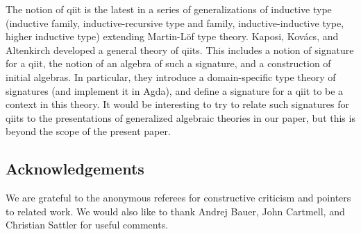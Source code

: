 \documentclass{mscs}
\newcommand{\FYI}[1]{{#1}}
\begin{document}

The notion of qiit is the latest in a series of generalizations of inductive type (inductive family, inductive-recursive type and family, inductive-inductive type, higher inductive type) extending Martin-Löf type theory. Kaposi, Kov{\'{a}}cs, and Altenkirch \cite{kaposi:qiits} developed a general theory of qiits. This includes a notion of signature for a qiit, the notion of an algebra of such a signature, and a construction of initial algebras. In particular, they introduce a domain-specific type theory of signatures (and implement it in Agda), and define a signature for a qiit to be a context in this theory. It would be interesting to try to relate such signatures for qiits to the \FYI{presentations} of generalized algebraic theories in our paper, but this is beyond the scope of the present paper.





\subsection*{Acknowledgements}
We are grateful to the anonymous referees for constructive criticism and pointers to related work. We would also like to thank Andrej Bauer, John Cartmell, and Christian Sattler for useful comments.




\end{document}
